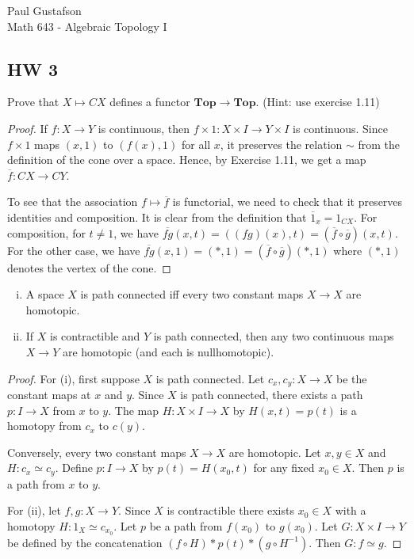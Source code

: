 \documentclass{article}
\begin{document}
\noindent Paul Gustafson\\
\noindent Math 643 - Algebraic Topology I


\subsection*{HW 3}
 Prove that $X \mapsto CX$ defines a functor $\mathbf{Top}  \to \mathbf{Top}$. (Hint: use exercise 1.11)
\begin{proof}
If $f:X \to Y$ is continuous, then $f \times 1: X \times I \to Y \times I$ is continuous. Since $f \times 1$ maps
$(x,1)$ to $(f(x), 1)$ for all $x$, it preserves the relation $\sim$ from the definition of the cone over a space.
Hence, by Exercise 1.11, we get a map $\overline f : CX \to CY$. 

To see that the association $f \mapsto \overline f$ is functorial, we need to check that it preserves identities
and composition. It is clear from the definition that $\overline 1_x = 1_{CX}$.  For composition, for $t \neq 1$,
we have $\overline{fg}(x,t) = ((fg)(x),t) = (\overline f \circ \overline g) (x,t)$.  For the other case, we have
$\overline{fg}(x,1) = (*,1) = (\overline f \circ \overline g) (*,1)$ where
$(*,1)$ denotes the vertex of the cone.
\end{proof}

 \begin{enumerate}[(i)] 
\item A space $X$ is path connected iff every two constant maps $X \to X$ are homotopic.
\item If $X$ is contractible and $Y$ is path connected, then any two continuous maps
$X \to Y$ are homotopic (and each is nullhomotopic).
\end{enumerate}

\begin{proof}
For (i), first suppose $X$ is path connected.  Let $c_x, c_y: X \to X$ be the constant maps at $x$ and $y$.
Since $X$ is path connected, there exists a path $p:I \to X$ from $x$ to $y$.  
The map $H:X \times I \to X$ by $H(x,t) = p(t)$ is a homotopy from $c_x$ to $c(y)$.

Conversely, every two constant maps $X \to X$ are homotopic. Let $x,y \in X$ and $H: c_x \simeq c_y$. 
Define $p:I \to X$ by $p(t) = H(x_0,t)$ for any fixed $x_0 \in X$. Then $p$ is a path from $x$ to $y$.

For (ii), let $f, g: X \to Y$. Since $X$ is contractible there exists $x_0 \in X$ with a homotopy $H: 1_X \simeq c_{x_0}$.
Let $p$ be a path from $f(x_0)$ to $g(x_0)$. Let $G:X \times I \to Y$ be defined by the concatenation 
$(f \circ H) * p(t) * (g \circ H^{-1})$. Then $G: f \simeq g$.
\end{proof}
\end{document}
